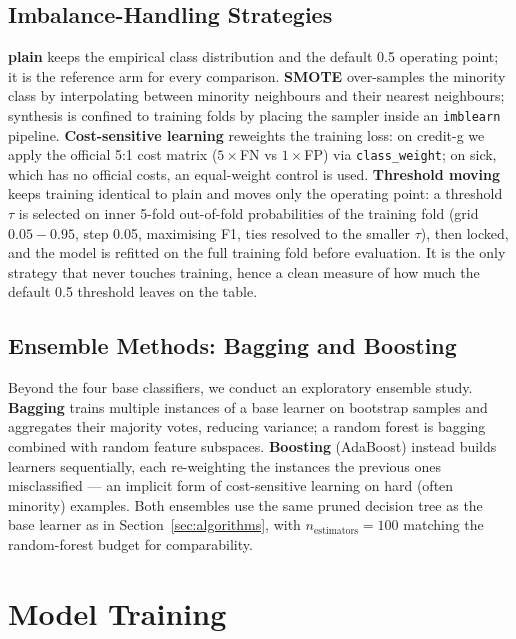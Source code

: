 \documentclass[a4paper,12pt]{article}
\begin{document}
\subsection{Imbalance-Handling Strategies}
\label{ssec:strategies}
\textbf{plain} keeps the empirical class distribution and the default
0.5 operating point; it is the reference arm for every comparison.
\textbf{SMOTE} over-samples the minority class by interpolating
between minority neighbours and their nearest neighbours; synthesis is
confined to training folds by placing the sampler inside an
\texttt{imblearn} pipeline. \textbf{Cost-sensitive learning} reweights
the training loss: on credit-g we apply the official 5:1 cost matrix
($5\times$FN vs $1\times$FP) via \texttt{class\_weight}; on sick,
which has no official costs, an equal-weight control is used.
\textbf{Threshold moving} keeps training identical to plain and moves
only the operating point: a threshold $\tau$ is selected on inner
5-fold out-of-fold probabilities of the training fold (grid
$0.05{-}0.95$, step 0.05, maximising F1, ties resolved to the smaller
$\tau$), then locked, and the model is refitted on the full training
fold before evaluation. It is the only strategy that never touches
training, hence a clean measure of how much the default 0.5 threshold
leaves on the table.

\subsection{Ensemble Methods: Bagging and Boosting}
\label{ssec:ensemble-concepts}
Beyond the four base classifiers, we conduct an exploratory ensemble
study. \textbf{Bagging} trains multiple instances of a base learner on
bootstrap samples and aggregates their majority votes, reducing
variance; a random forest is bagging combined with random feature
subspaces. \textbf{Boosting} (AdaBoost) instead builds learners
sequentially, each re-weighting the instances the previous ones
misclassified --- an implicit form of cost-sensitive learning on hard
(often minority) examples. Both ensembles use the same pruned decision
tree as the base learner as in Section~\ref{sec:algorithms}, with
$n_{\text{estimators}}=100$ matching the random-forest budget for
comparability.


\section{Model Training}
\label{sec:training}
\end{document}
